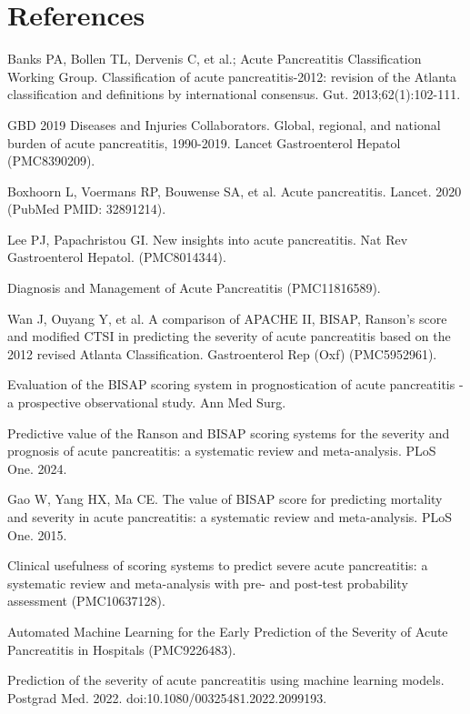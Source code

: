 \documentclass[twoside,11pt]{article}
\begin{document}
\newpage
\section*{References}
\begin{small}
\noindent [1] Banks PA, Bollen TL, Dervenis C, et al.; Acute Pancreatitis Classification Working Group. Classification of acute pancreatitis-2012: revision of the Atlanta classification and definitions by international consensus. Gut. 2013;62(1):102-111.

\noindent [2] GBD 2019 Diseases and Injuries Collaborators. Global, regional, and national burden of acute pancreatitis, 1990-2019. Lancet Gastroenterol Hepatol (PMC8390209).

\noindent [3] Boxhoorn L, Voermans RP, Bouwense SA, et al. Acute pancreatitis. Lancet. 2020 (PubMed PMID: 32891214).

\noindent [4] Lee PJ, Papachristou GI. New insights into acute pancreatitis. Nat Rev Gastroenterol Hepatol. (PMC8014344).

\noindent [5] Diagnosis and Management of Acute Pancreatitis (PMC11816589).

\noindent [6] Wan J, Ouyang Y, et al. A comparison of APACHE II, BISAP, Ranson's score and modified CTSI in predicting the severity of acute pancreatitis based on the 2012 revised Atlanta Classification. Gastroenterol Rep (Oxf) (PMC5952961).

\noindent [7] Evaluation of the BISAP scoring system in prognostication of acute pancreatitis - a prospective observational study. Ann Med Surg.

\noindent [8] Predictive value of the Ranson and BISAP scoring systems for the severity and prognosis of acute pancreatitis: a systematic review and meta-analysis. PLoS One. 2024.

\noindent [9] Gao W, Yang HX, Ma CE. The value of BISAP score for predicting mortality and severity in acute pancreatitis: a systematic review and meta-analysis. PLoS One. 2015.

\noindent [10] Clinical usefulness of scoring systems to predict severe acute pancreatitis: a systematic review and meta-analysis with pre- and post-test probability assessment (PMC10637128).

\noindent [11] Automated Machine Learning for the Early Prediction of the Severity of Acute Pancreatitis in Hospitals (PMC9226483).

\noindent [12] Prediction of the severity of acute pancreatitis using machine learning models. Postgrad Med. 2022. doi:10.1080/00325481.2022.2099193.


\end{small}
\end{document}
